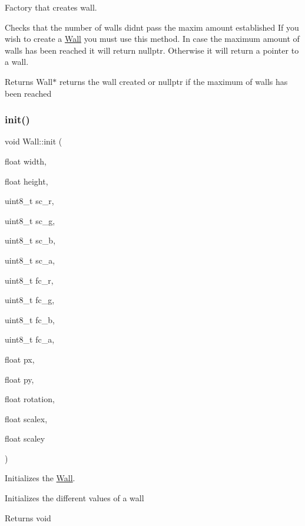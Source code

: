 Factory that creates wall. 

Checks that the number of walls didn\textquotesingle{}t pass the maxim amount established If you wish to create a \hyperlink{class_wall}{Wall} you must use this method. In case the maximum amount of walls has been reached it will return nullptr. Otherwise it will return a pointer to a wall.

\begin{DoxyReturn}{Returns}
Wall$\ast$ returns the wall created or nullptr if the maximum of walls has been reached 
\end{DoxyReturn}
\mbox{\label{class_wall_a49c23105741c9f9d546a131a08573e9f}} 
\subsubsection{\texorpdfstring{init()}{init()}}
{\footnotesize\ttfamily void Wall\+::init (\begin{DoxyParamCaption}\item[{float}]{width,  }\item[{float}]{height,  }\item[{uint8\+\_\+t}]{sc\+\_\+r,  }\item[{uint8\+\_\+t}]{sc\+\_\+g,  }\item[{uint8\+\_\+t}]{sc\+\_\+b,  }\item[{uint8\+\_\+t}]{sc\+\_\+a,  }\item[{uint8\+\_\+t}]{fc\+\_\+r,  }\item[{uint8\+\_\+t}]{fc\+\_\+g,  }\item[{uint8\+\_\+t}]{fc\+\_\+b,  }\item[{uint8\+\_\+t}]{fc\+\_\+a,  }\item[{float}]{px,  }\item[{float}]{py,  }\item[{float}]{rotation,  }\item[{float}]{scalex,  }\item[{float}]{scaley }\end{DoxyParamCaption})}



Initializes the \hyperlink{class_wall}{Wall}. 

Initializes the different values of a wall

\begin{DoxyReturn}{Returns}
void 
\end{DoxyReturn}

